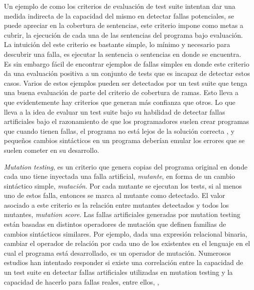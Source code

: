 Un ejemplo de como los criterios de evaluaci\'on de test suite intentan dar una medida indirecta de la capacidad del mismo en detectar fallas potenciales, se puede apreciar en la cobertura de sentencias, este criterio impone como metas a cubrir, la ejecuci\'on de cada una de las sentencias del programa bajo evaluaci\'on. La intuici\'on del este criterio es bastante simple, lo m\'inimo y necesario para descubrir una falla, es ejecutar la sentencia o sentencias en donde se encuentra. Es sin embargo f\'acil de encontrar ejemplos de fallas simples en donde este criterio da una evaluaci\'on positiva a un conjunto de tests que es incapaz de detectar estos casos. Varios de estos ejemplos pueden ser detectados por un test suite que tenga una buena evaluaci\'on de parte del criterio de cobertura de ramas. Esto lleva a que evidentemente hay criterios que generan m\'as confianza que otros. Lo que lleva a la idea de evaluar un test suite bajo su habilidad de detectar fallas artificiales bajo el razonamiento de que los programadores suelen crear programas que cuando tienen fallas, el programa no est\'a lejos de la soluci\'on correcta \cite{bibliography.mutation.DeMillo}, y peque\~nos cambios sint\'acticos en un programa deber\'ian emular los errores que se suelen cometer en su desarrollo.

\emph{Mutation testing}, es un criterio que genera copias del programa original en donde cada uno tiene inyectada una falla artificial, \emph{mutante}, en forma de un cambio sint\'actico simple, \emph{mutaci\'on}. Por cada mutante se ejecutan los tests, si al menos uno de estos falla, entonces se marca al mutante como detectado. El valor asociado a este criterio es la relaci\'on entre mutantes detectados y todos los mutantes, \emph{mutation score}. Las fallas artificiales generadas por mutation testing est\'an basadas en distintos operadores de mutaci\'on que definen familias de cambios sint\'acticos similares. Por ejemplo, dada una expresi\'on relacional binaria, cambiar el operador de relaci\'on por cada uno de los existentes en el lenguaje en el cual el programa est\'a desarrollado, es un operador de mutaci\'on. Numerosos estudios han intentado responder si existe una correlaci\'on entre la capacidad de un test suite en detectar fallas artificiales utilizadas en mutation testing y la capacidad de hacerlo para fallas reales, entre ellos, \cite{bibliography.mutation.evaluation.coupling.Offutt89, bibliography.mutation.evaluation.coupling.Offutt92, bibliography.mutation.evaluation.HAndrews05, bibliography.mutation.evaluation.valid-substitute}, 

